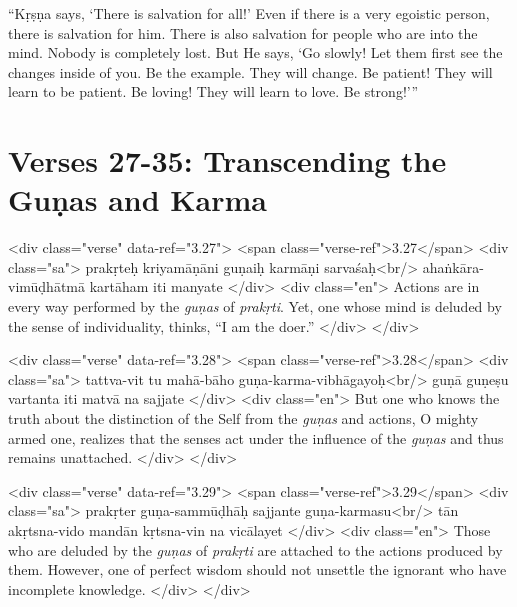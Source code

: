 \enquote{Kṛṣṇa says, \enquote{There is salvation for all!} Even if there is a very egoistic person, there is salvation for him. There is also salvation for people who are into the mind. Nobody is completely lost. But He says, \enquote{Go slowly! Let them first see the changes inside of you. Be the example. They will change. Be patient! They will learn to be patient. Be loving! They will learn to love. Be strong!}}

\newpage
\section{Verses 27-35: Transcending the Guṇas and Karma}\label{sec-verses-27-35-transcending-the-gunas-and-karma}

\begin{html}
<div class="verse" data-ref="3.27">
  <span class="verse-ref">3.27</span>
  <div class="sa">
    prakṛteḥ kriyamāṇāni guṇaiḥ karmāṇi sarvaśaḥ<br/>
    ahaṅkāra-vimūḍhātmā kartāham iti manyate
  </div>
  <div class="en">
    Actions are in every way performed by the \textit{guṇas} of \textit{prakṛti}. Yet, one whose mind is deluded by the sense of individuality, thinks, \enquote{I am the doer.}
  </div>
</div>
\end{html}



\begin{html}
<div class="verse" data-ref="3.28">
  <span class="verse-ref">3.28</span>
  <div class="sa">
    tattva-vit tu mahā-bāho guṇa-karma-vibhāgayoḥ<br/>
    guṇā guṇeṣu vartanta iti matvā na sajjate
  </div>
  <div class="en">
    But one who knows the truth about the distinction of the Self from the \textit{guṇas} and actions, O mighty armed one, realizes that the senses act under the influence of the \textit{guṇas} and thus remains unattached.
  </div>
</div>
\end{html}



\begin{html}
<div class="verse" data-ref="3.29">
  <span class="verse-ref">3.29</span>
  <div class="sa">
    prakṛter guṇa-sammūḍhāḥ sajjante guṇa-karmasu<br/>
    tān akṛtsna-vido mandān kṛtsna-vin na vicālayet
  </div>
  <div class="en">
    Those who are deluded by the \textit{guṇas} of \textit{prakṛti} are attached to the actions produced by them. However, one of perfect wisdom should not unsettle the ignorant who have incomplete knowledge.
  </div>
</div>
\end{html}




